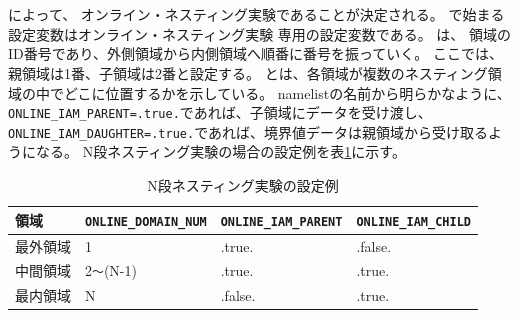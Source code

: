 \\
{\small {\gt
{}}}\\

\noindent
{}によって、
オンライン・ネスティング実験であることが決定される。
で始まる設定変数はオンライン・ネスティング実験
専用の設定変数である。
は、
領域のID番号であり、外側領域から内側領域へ順番に番号を振っていく。
ここでは、親領域は1番、子領域は2番と設定する。
とは、各領域が複数のネスティング領域の中でどこに位置するかを示している。
namelistの名前から明らかなように、
\verb|ONLINE_IAM_PARENT=.true.|であれば、子領域にデータを受け渡し、
\verb|ONLINE_IAM_DAUGHTER=.true.|であれば、境界値データは親領域から受け取るようになる。
N段ネスティング実験の場合の設定例を表\ref{tab:triple_nested}に示す。

\begin{table}[htb]
\begin{center}
\caption{N段ネスティング実験の設定例}
\begin{tabularx}{150mm}{|l|l|l|X|} \hline
 \rowcolor[gray]{0.9} 領域 & \verb|ONLINE_DOMAIN_NUM| & \verb|ONLINE_IAM_PARENT| & \verb|ONLINE_IAM_CHILD|\\ \hline
 最外領域 & 1               & .true.  & .false. \\ \hline
 中間領域 & 2\verb|〜|(N-1) & .true.  & .true. \\ \hline
 最内領域 & N               & .false. & .true. \\ \hline
\end{tabularx}
\label{tab:triple_nested}
\end{center}
\end{table}

